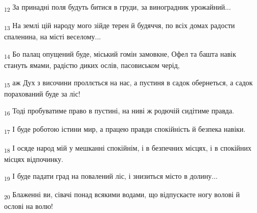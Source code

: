 \begin{tcolorbox}
\textsubscript{12} За принадні поля будуть битися в груди, за виноградник урожайний...
\end{tcolorbox}
\begin{tcolorbox}
\textsubscript{13} На землі цій народу мого зійде терен й будяччя, по всіх домах радости спаленина, на місті веселому...
\end{tcolorbox}
\begin{tcolorbox}
\textsubscript{14} Бо палац опущений буде, міський гомін замовкне, Офел та башта навік стануть ямами, радістю диких ослів, пасовиськом черід,
\end{tcolorbox}
\begin{tcolorbox}
\textsubscript{15} аж Дух з височини проллється на нас, а пустиня в садок обернеться, а садок порахований буде за ліс!
\end{tcolorbox}
\begin{tcolorbox}
\textsubscript{16} Тоді пробуватиме право в пустині, на ниві ж родючій сидітиме правда.
\end{tcolorbox}
\begin{tcolorbox}
\textsubscript{17} І буде роботою істини мир, а працею правди спокійність й безпека навіки.
\end{tcolorbox}
\begin{tcolorbox}
\textsubscript{18} І осяде народ мій у мешканні спокійнім, і в безпечних місцях, і в спокійних місцях відпочинку.
\end{tcolorbox}
\begin{tcolorbox}
\textsubscript{19} І буде падати град на повалений ліс, і знизиться місто в долину...
\end{tcolorbox}
\begin{tcolorbox}
\textsubscript{20} Блаженні ви, сівачі понад всякими водами, що відпускаєте ногу волові й ослові на волю!
\end{tcolorbox}
